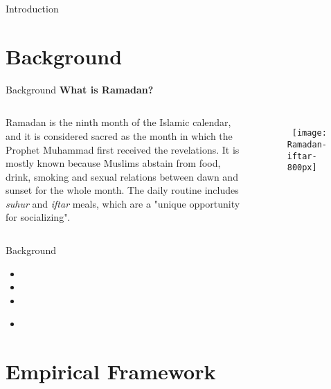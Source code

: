 \documentclass[pdftex,12pt,xcolor=pdftex,table]{beamer}
\begin{document}
\begin{frame}{Introduction}
\section{Background}
    \begin{frame}[t]{Background}
    \textbf{What is Ramadan?}
    \vspace{0.5cm}
    
    \begin{columns}[onlytextwidth]
    Ramadan is the ninth month of the Islamic calendar, and it is considered sacred as the month in which the Prophet Muhammad first received the revelations. It is mostly known because Muslims abstain from food, drink, smoking and sexual relations between dawn and sunset for the whole month. The daily routine includes \textit{suhur} and \textit{iftar} meals, which are a "unique opportunity for socializing".
    \begin{figure}[t]
    \, \texttt{[image: Ramadan-iftar-800px]}
    \end{figure}
    \end{columns}
    \end{frame}
    
    \begin{frame}{Background}
    \begin{itemize}
    \item {}
    \item {}
    \item {}
    \end{itemize}
    \begin{itemize}
    \item {}
    \end{itemize}
    \end{frame}

\section{Empirical Framework}

\end{frame}
\end{document}

